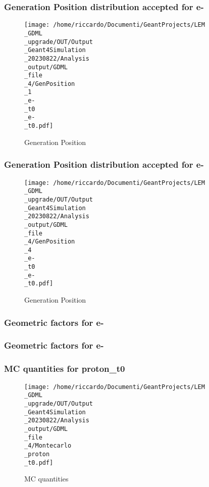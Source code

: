 \documentclass[8pt]{beamer}
\begin{document}
            \begin{frame}
                \frametitle{Generation Position distribution accepted for e-}
            
        \begin{figure}[h]
            \centering
            \texttt{[image: /home/riccardo/Documenti/GeantProjects/LEM\\\_GDML\\\_upgrade/OUT/Output\\\_Geant4Simulation\\\_20230822/Analysis\\\_output/GDML\\\_file\\\_4/GenPosition\\\_1\\\_e-\\\_t0\\\_e-\\\_t0.pdf]}
            \caption{Generation Position}
        \end{figure}
        
            \end{frame}
            
            \begin{frame}
                \frametitle{Generation Position distribution accepted for e-}
            
        \begin{figure}[h]
            \centering
            \texttt{[image: /home/riccardo/Documenti/GeantProjects/LEM\\\_GDML\\\_upgrade/OUT/Output\\\_Geant4Simulation\\\_20230822/Analysis\\\_output/GDML\\\_file\\\_4/GenPosition\\\_4\\\_e-\\\_t0\\\_e-\\\_t0.pdf]}
            \caption{Generation Position}
        \end{figure}
        
            \end{frame}
            
            \begin{frame}
                \frametitle{Geometric factors for e-}
            
            \end{frame}
            
            \begin{frame}
                \frametitle{Geometric factors for e-}
            
            \end{frame}
            
            \begin{frame}
                \frametitle{MC quantities for proton\_t0}
            
        \begin{figure}[h]
            \centering
            \texttt{[image: /home/riccardo/Documenti/GeantProjects/LEM\\\_GDML\\\_upgrade/OUT/Output\\\_Geant4Simulation\\\_20230822/Analysis\\\_output/GDML\\\_file\\\_4/Montecarlo\\\_proton\\\_t0.pdf]}
            \caption{MC quantities}
        \end{figure}
        
            \end{frame}
            
\end{document}
